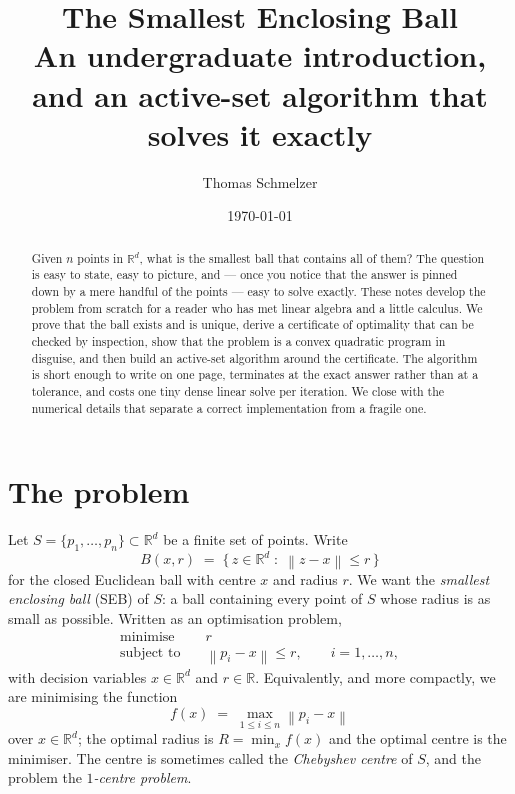 \documentclass[11pt,a4paper]{article}
\title{\bfseries The Smallest Enclosing Ball\\[0.4em]
  \large An undergraduate introduction, and an active-set algorithm that solves it exactly}
\author{Thomas Schmelzer}
\date{\today}
\theoremstyle{plain}
\theoremstyle{definition}
\theoremstyle{remark}
\newcommand{\R}{\mathbb{R}}
\newcommand{\norm}[1]{\left\lVert #1 \right\rVert}
\begin{document}
\maketitle

\begin{abstract}
Given $n$ points in $\R^d$, what is the smallest ball that contains all of them?
The question is easy to state, easy to picture, and --- once you notice that the
answer is pinned down by a mere handful of the points --- easy to solve exactly.
These notes develop the problem from scratch for a reader who has met linear
algebra and a little calculus. We prove that the ball exists and is unique, derive
a certificate of optimality that can be checked by inspection, show that the
problem is a convex quadratic program in disguise, and then build an active-set
algorithm around the certificate. The algorithm is short enough to write on one
page, terminates at the exact answer rather than at a tolerance, and costs one
tiny dense linear solve per iteration. We close with the numerical details that
separate a correct implementation from a fragile one.
\end{abstract}

\tableofcontents

\section{The problem}
\label{sec:problem}

Let $S=\{p_1,\dots,p_n\}\subset\R^d$ be a finite set of points. Write
\[
  B(x,r) \;=\; \{\, z\in\R^d \;:\; \norm{z-x}\le r \,\}
\]
for the closed Euclidean ball with centre $x$ and radius $r$. We want the
\emph{smallest enclosing ball} (SEB) of $S$: a ball containing every point of
$S$ whose radius is as small as possible. Written as an optimisation problem,
\begin{equation}
  \label{eq:primal}
  \begin{aligned}
    \text{minimise} \quad & r \\
    \text{subject to} \quad & \norm{p_i - x} \le r, \qquad i=1,\dots,n,
  \end{aligned}
\end{equation}
with decision variables $x\in\R^d$ and $r\in\R$. Equivalently, and more
compactly, we are minimising the function
\begin{equation}
  \label{eq:minimax}
  f(x) \;=\; \max_{1\le i\le n} \norm{p_i - x}
\end{equation}
over $x \in \R^d$; the optimal radius is $R = \min_x f(x)$ and the optimal centre
is the minimiser. The centre is sometimes called the \emph{Chebyshev centre} of
$S$, and the problem the \emph{$1$-centre problem}.
\end{document}
